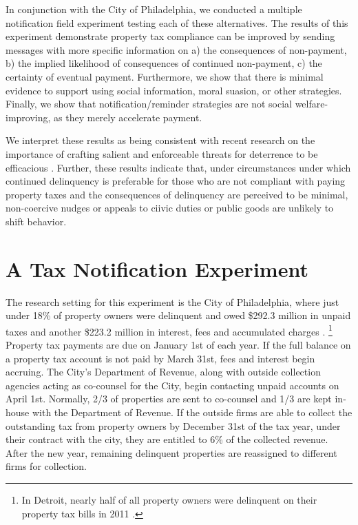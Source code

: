 \documentclass[12pt,titlepage]{article}
\begin{document}
In conjunction with the City of Philadelphia, we conducted a multiple 
notification field experiment testing each of these alternatives. The 
results of this experiment demonstrate property tax compliance 
can be improved by sending messages with more specific information on
a) the consequences of non-payment, b) the implied likelihood of 
consequences of continued non-payment, c) the certainty of eventual 
payment. Furthermore, we show that there is minimal evidence to support 
using social information, moral suasion, or other strategies. Finally, 
we show that notification/reminder strategies are not social 
welfare-improving, as they merely accelerate payment. 


We interpret these results as being consistent with recent research 
on the importance of crafting salient and enforceable threats for 
deterrence to be efficacious \citep{hawken}. Further, these results indicate
that, under circumstances under which continued delinquency is preferable 
for those who are not compliant with paying property taxes and the consequences of delinquency are 
perceived to be minimal, non-coercive nudges or appeals to ciivic duties or public goods are 
unlikely to shift behavior. 

\section{A Tax Notification Experiment}

The research setting for this experiment is the City of
Philadelphia, where just under
18\% of property owners were delinquent and owed 
\$292.3 million in unpaid taxes and another \$223.2 million in interest,
fees and accumulated charges \citep{pew}.
\footnote{
	In Detroit, nearly half of all property owners were delinquent
    on their property tax bills in 2011 \citep{macdonald}.
}
Property tax payments are due on January 1st of each year. If the full balance on a
property tax account is not paid  by March 31st, fees and interest
begin accruing. The City's Department of Revenue, along with outside
collection agencies acting as co-counsel for the City, begin contacting
unpaid accounts on April 1st. Normally, 2/3 of properties are sent to
co-counsel and 1/3 are kept in-house with the Department of Revenue. If the outside firms are able to
collect the outstanding tax from property owners by December 31st of the
tax year, under their contract with the city, they are entitled to 6\% of
the collected revenue. After the new year, remaining delinquent properties
are reassigned to different firms for collection.
\end{document}
